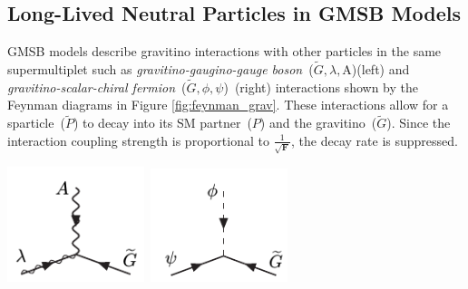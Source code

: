 \subsection{Long-Lived Neutral Particles in GMSB Models}\label{long-lived}
GMSB models describe gravitino interactions with other particles in the same supermultiplet such as \textit{gravitino-gaugino-gauge boson}~($\tilde{G},\lambda,\mathrm{A}$)(left) and \textit{gravitino-scalar-chiral fermion}~($\tilde{G},\phi,\psi$)~(right) interactions shown by the Feynman diagrams in Figure \ref{fig:feynman_grav}. These interactions allow for a sparticle~($\tilde{P}$) to decay into its SM partner~($P$) and the gravitino~($\tilde{G}$). Since the interaction coupling strength is proportional to $\frac{1}{\sqrt{\mathbf{F}}}$, the decay rate is suppressed.

\vspace{5mm}
\begin{minipage}{0.90\linewidth}
\begin{center}
\centering
\mbox{\includegraphics[height=0.3\textwidth, width=0.3\textwidth]{THESISPLOTS/Gravitino-Gaugino-Coupling.png} \quad
\includegraphics[height=0.3\textwidth, width=0.3\textwidth]{THESISPLOTS/Gravitino-Scalar-Coupling.png}
} 
\label{fig:feynman_grav}
\end{center}
\end{minipage}

